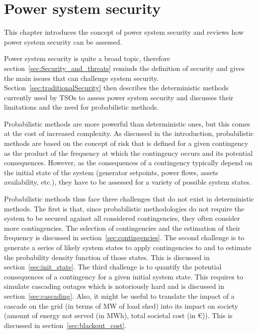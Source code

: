 \chapter{Power system security}
\label{ch:security}
\adjustmtc
\adjustmtc
\minitoc

This chapter introduces the concept of power system security and reviews how power system security can be assessed.

Power system security is quite a broad topic, therefore section~\ref{sec:Security_and_threats} reminds the definition of security and gives the main issues that can challenge system security. Section~\ref{sec:traditionalSecurity} then describes the deterministic methods currently used by TSOs to assess power system security and discusses their limitations and the need for probabilistic methods.

Probabilistic methods are more powerful than deterministic ones, but this comes at the cost of increased complexity. As discussed in the introduction, probabilistic methods are based on the concept of risk that is defined for a given contingency as the product of the frequency at which the contingency occurs and its potential consequences. However, as the consequences of a contingency typically depend on the initial state of the system (generator setpoints, power flows, assets availability, etc.), they have to be assessed for a variety of possible system states.

Probabilistic methods thus face three challenges that do not exist in deterministic methods. The first is that, since probabilistic methodologies do not require the system to be secured against all considered contingencies, they often consider more contingencies. The selection of contingencies and the estimation of their frequency is discussed in section~\ref{sec:contingencies}. The second challenge is to generate a series of likely system states to apply contingencies to and to estimate the probability density function of those states. This is discussed in section~\ref{sec:init_state}. The third challenge is to quantify the potential consequences of a contingency for a given initial system state. This requires to simulate cascading outages which is notoriously hard and is discussed in section~\ref{sec:cascading}. Also, it might be useful to translate the impact of a cascade on the grid (\eg in terms of MW of load shed) into its impact on society (\eg amount of energy not served (in MWh), total societal cost (in €)). This is discussed in section~\ref{sec:blackout_cost}.

